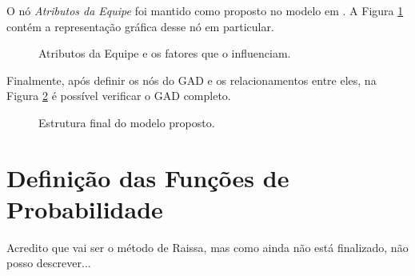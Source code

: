 O nó \textit{Atributos da Equipe} foi mantido como proposto no modelo em \cite{freire}. A Figura \ref{modelo:gad:atributos} contém a representação gráfica desse nó em particular.

\begin{figure}[ht!]	
\begin{center}
	\end{center}
	\caption{Atributos da Equipe e os fatores que o influenciam.}
	\label{modelo:gad:atributos}
\end{figure}

Finalmente, após definir os nós do GAD e os relacionamentos entre eles, na Figura \ref{modelo:gad:final} é possível verificar o GAD completo.

\begin{figure}[ht!]	
\begin{center}
	\end{center}
	\caption{Estrutura final do modelo proposto.}
	\label{modelo:gad:final}
\end{figure}

\section{Definição das Funções de Probabilidade}
\label{modelo:funcoes}

{\color{red} Acredito que vai ser o método de Raissa, mas como ainda não está finalizado, não posso descrever...}
